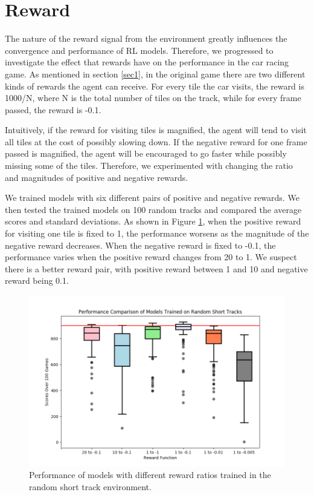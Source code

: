 \newpage
\section{Reward}
The nature of the reward signal from the environment greatly
influences the convergence and performance of RL models. Therefore, we
progressed to investigate the effect that rewards have on the
performance in the car racing game. As mentioned in section
\ref{sec1}, in the original game there are two different kinds of
rewards the agent can receive. For every tile the car visits, the
reward is 1000/N, where N is the total number of tiles on the track,
while for every frame passed, the reward is -0.1.  
\par
Intuitively, if the reward for visiting tiles is magnified, the agent
will tend to visit all tiles at the cost of possibly slowing down. If
the negative reward for one frame passed is magnified, the agent will
be encouraged to go faster while possibly missing some of the
tiles. Therefore, we experimented with changing the ratio and
magnitudes of positive and negative rewards.  
\par 
We trained models with six different pairs of positive and negative
rewards. We then tested the trained models on 100 random tracks and
compared the average scores and standard deviations. As shown in
Figure \ref{fig:rewardclip}, when the positive reward for visiting one
tile is fixed to 1, the performance worsens as the magnitude of the
negative reward decreases. When the negative reward is fixed to -0.1,
the performance varies when the positive reward changes from 20 to
1. We suspect there is a better reward pair, with positive reward
between 1 and 10 and negative reward being 0.1.  
\newpage
\begin{figure}[h!]
\centering\includegraphics[scale=0.5,clip]{Graphics/performance_clip_reward.png}
\caption[Clip Reward Performance]{Performance of models with different
  reward ratios trained in the random short track
  environment.}\label{fig:rewardclip} 
\end{figure}

\endinput


